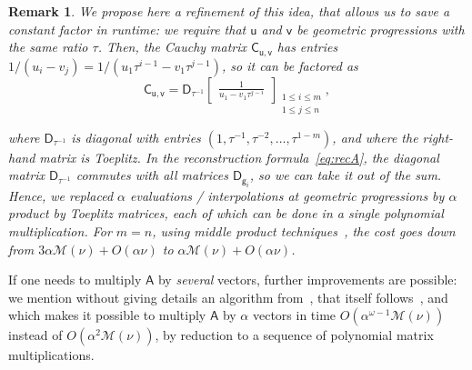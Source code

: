 \documentclass[sigconf]{acmart}
\newcommand{\vg}{\ensuremath{\mathsf{g}}}
\newcommand{\vu}{\ensuremath{\mathsf{u}}}
\newcommand{\vv}{\ensuremath{\mathsf{v}}}
\newcommand{\mA}{\ensuremath{\mathsf{A}}}
\newcommand{\mC}{\ensuremath{\mathsf{C}}}
\newcommand{\mD}{\ensuremath{\mathsf{D}}}
\newcommand{\M}{\ensuremath{\mathscr{M}}}
\newcommand{\mx}{\ensuremath{\nu}}
\theoremstyle{acmdefinition}
\newtheorem{remark}[theorem]{Remark}
\begin{document}
\vspace{-2mm}

\begin{remark}\label{rmk:factor3}
We propose here a refinement of this idea, that allows us to
save a constant factor in runtime: we require that $\vu$ and $\vv$ be
geometric progressions with {\em the same ratio} $\tau$. Then, the
Cauchy matrix $\mC_{\vu,\vv}$ has entries $1/(u_i -
v_j) = 1/(u_1 \tau^{i-1} - v_1 \tau^{j-1})$, so it can be factored as
\vspace{-3px}
$$
\mC_{\vu,\vv}=\mD_{\tau^{-1}}
\begin{bmatrix}
\frac{1}{u_1 - v_1 \tau^{j-i}}
\end{bmatrix}_{\substack{1 \leq i \leq m\\1 \leq j \leq n}},
$$

\vspace{-3px}
\noindent where $\mD_{\tau^{-1}}$ is diagonal with entries
$(1,\tau^{-1},\tau^{-2},\dots,\tau^{1-m})$, and where the right-hand
matrix is Toeplitz. In the reconstruction formula~\eqref{eq:recA}, the
diagonal matrix $\mD_{\tau^{-1}}$ commutes with all matrices
$\mD_{\vg_i}$, so we can take it out of the sum. Hence, we replaced
$\alpha$ evaluations / interpolations at geometric progressions by
$\alpha$ product by Toeplitz matrices, each of which can be done in a
single polynomial multiplication.
%
%
For $m=n$, using middle product techniques~\cite{HaQuZi04,BoLeSc03},
the cost goes down from $3\alpha \M(\mx) +O(\alpha \mx)$ to
$\alpha \M(\mx) +O(\alpha \mx)$.
\end{remark}

If one needs to multiply $\mA$ by {\em several} vectors,
further improvements are possible: we mention without giving details
an algorithm from~\cite{BoJeMoSc16}, that itself
follows~\cite{BoJeSc08}, and which makes it possible to multiply $\mA$
by $\alpha$ vectors in time $O(\alpha^{\omega-1} \M(\mx))$ instead of
$O(\alpha^2 \M(\mx))$, by reduction to a sequence of polynomial matrix
multiplications.
\end{document}
